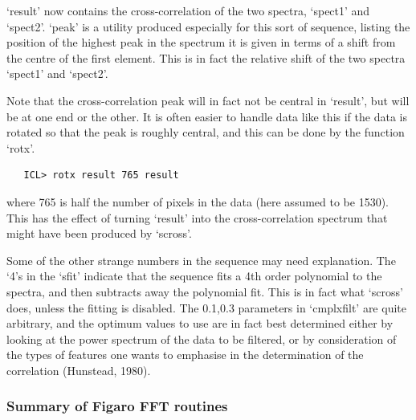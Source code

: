 \documentclass[11pt,twoside]{article}
\begin{document}
   `result' now contains the cross-correlation of the two spectra,
   `spect1' and `spect2'.  `peak' is a utility produced especially for
   this sort of sequence, listing the position of the highest peak in
   the spectrum it is given in terms of a shift from the centre of the
   first element.  This is in fact the relative shift of the two spectra
   `spect1' and `spect2'.

   Note that the cross-correlation peak will in fact not be central in
   `result', but will be at one end or the other.  It is often easier to
   handle data like this if the data is rotated so that the peak is
   roughly central, and this can be done by the function `rotx'.

\begin{verbatim}
   ICL> rotx result 765 result
\end{verbatim}

   where 765 is half the number of pixels in the data (here assumed to
   be 1530).  This has the effect of turning `result' into the
   cross-correlation spectrum that might have been produced by `scross'.

   Some of the other strange numbers in the sequence may need
   explanation. The `4's in the `sfit' indicate that the sequence fits a
   4th order polynomial to the spectra, and then subtracts away the
   polynomial fit.  This is in fact what `scross' does, unless the
   fitting is disabled.  The 0.1,0.3 parameters in `cmplxfilt' are quite
   arbitrary, and the optimum values to use are in fact best determined
   either by looking at the power spectrum of the data to be filtered,
   or by consideration of the types of features one wants to emphasise
   in the determination of the correlation (Hunstead, 1980).


\subsubsection{\label{techno6summary}Summary of Figaro FFT routines}
\end{document}
